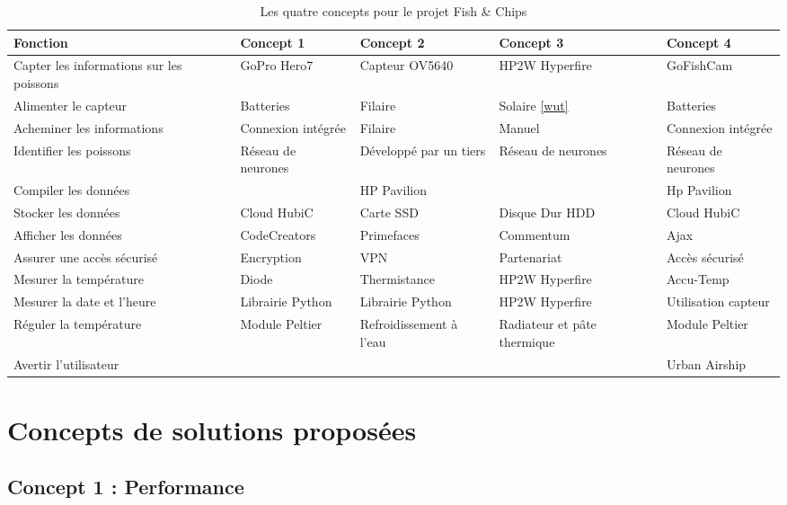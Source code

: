 \begin{table}[h]
    \centering
    \begin{tabular}{|p{3cm}|p{3cm}|p{2.5cm}|p{2.5cm}|p{2.5cm}|}
    \hline
    \textbf{Fonction} & \textbf{Concept 1} & \textbf{Concept 2} & \textbf{Concept 3} & \textbf{Concept 4}\\ \hline
    Capter les informations sur les poissons & GoPro Hero7 & Capteur OV5640 & HP2W Hyperfire & GoFishCam \\ \hline
    Alimenter le capteur & Batteries & Filaire & Solaire \ref{wut} & Batteries \\ \hline
    Acheminer les informations & Connexion intégrée & Filaire & Manuel & Connexion intégrée \\ \hline
    Identifier les poissons & Réseau de neurones & Développé par un tiers & Réseau de neurones & Réseau de neurones \\ \hline
    Compiler les données & & HP Pavilion & & Hp Pavilion\\ \hline
    Stocker les données & Cloud HubiC & Carte SSD & Disque Dur HDD & Cloud HubiC\\ \hline
    Afficher les données & CodeCreators & Primefaces & Commentum & Ajax\\ \hline
    Assurer une accès sécurisé & Encryption & VPN & Partenariat & Accès sécurisé\\ \hline
    Mesurer la température & Diode & Thermistance & HP2W Hyperfire & Accu-Temp\\ \hline
    Mesurer la date et l'heure & Librairie Python & Librairie Python & HP2W Hyperfire & Utilisation capteur \\ \hline
    Réguler la température & Module Peltier & Refroidissement à l'eau & Radiateur et pâte thermique & Module Peltier\\ \hline
    Avertir l'utilisateur &  &  &  & Urban Airship\\
    \hline
    \end{tabular}
    \caption{Les quatre concepts pour le projet Fish \& Chips}
    \label{tab:4_concepts}
\end{table}

\section{Concepts de solutions proposées}

\subsection{Concept 1 : Performance}


